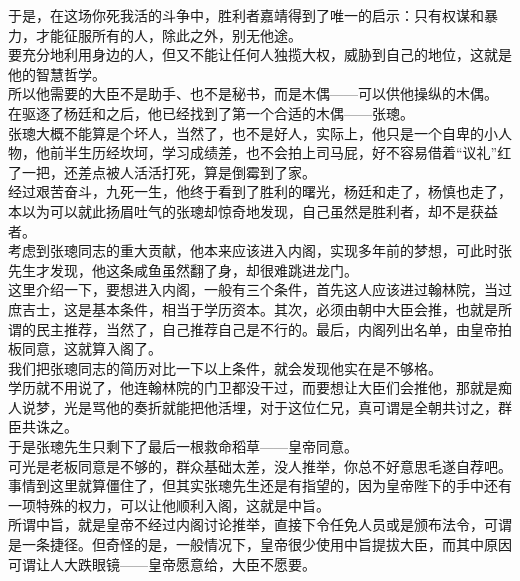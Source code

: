 \begin{multicols}{\theparacolNo}
于是，在这场你死我活的斗争中，胜利者嘉靖得到了唯一的启示：只有权谋和暴力，才能征服所有的人，除此之外，别无他途。\\

要充分地利用身边的人，但又不能让任何人独揽大权，威胁到自己的地位，这就是他的智慧哲学。\\

所以他需要的大臣不是助手、也不是秘书，而是木偶——可以供他操纵的木偶。\\

在驱逐了杨廷和之后，他已经找到了第一个合适的木偶——张璁。\\

张璁大概不能算是个坏人，当然了，也不是好人，实际上，他只是一个自卑的小人物，他前半生历经坎坷，学习成绩差，也不会拍上司马屁，好不容易借着“议礼”红了一把，还差点被人活活打死，算是倒霉到了家。\\

经过艰苦奋斗，九死一生，他终于看到了胜利的曙光，杨廷和走了，杨慎也走了，本以为可以就此扬眉吐气的张璁却惊奇地发现，自己虽然是胜利者，却不是获益者。\\

考虑到张璁同志的重大贡献，他本来应该进入内阁，实现多年前的梦想，可此时张先生才发现，他这条咸鱼虽然翻了身，却很难跳进龙门。\\

这里介绍一下，要想进入内阁，一般有三个条件，首先这人应该进过翰林院，当过庶吉士，这是基本条件，相当于学历资本。其次，必须由朝中大臣会推，也就是所谓的民主推荐，当然了，自己推荐自己是不行的。最后，内阁列出名单，由皇帝拍板同意，这就算入阁了。\\

我们把张璁同志的简历对比一下以上条件，就会发现他实在是不够格。\\

学历就不用说了，他连翰林院的门卫都没干过，而要想让大臣们会推他，那就是痴人说梦，光是骂他的奏折就能把他活埋，对于这位仁兄，真可谓是全朝共讨之，群臣共诛之。\\

于是张璁先生只剩下了最后一根救命稻草——皇帝同意。\\

可光是老板同意是不够的，群众基础太差，没人推举，你总不好意思毛遂自荐吧。\\

事情到这里就算僵住了，但其实张璁先生还是有指望的，因为皇帝陛下的手中还有一项特殊的权力，可以让他顺利入阁，这就是中旨。\\

所谓中旨，就是皇帝不经过内阁讨论推举，直接下令任免人员或是颁布法令，可谓是一条捷径。但奇怪的是，一般情况下，皇帝很少使用中旨提拔大臣，而其中原因可谓让人大跌眼镜——皇帝愿意给，大臣不愿要。\\


\end{multicols}
